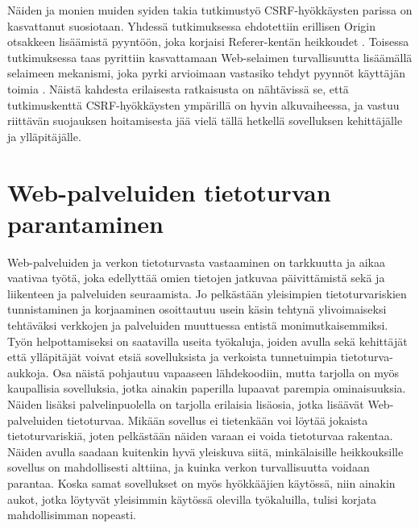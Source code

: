Näiden ja monien muiden syiden takia tutkimustyö CSRF-hyökkäysten parissa on kasvattanut suosiotaan. Yhdessä tutkimuksessa ehdotettiin erillisen Origin
otsakkeen lisäämistä pyyntöön, joka korjaisi Referer-kentän heikkoudet \cite{CSRF}. Toisessa tutkimuksessa taas pyrittiin kasvattamaan Web-selaimen turvallisuutta
lisäämällä selaimeen mekanismi, joka pyrki arvioimaan vastasiko tehdyt pyynnöt käyttäjän toimia \cite{CSRFb}. Näistä kahdesta erilaisesta ratkaisusta on nähtävissä se,
että tutkimuskenttä CSRF-hyökkäysten ympärillä on hyvin alkuvaiheessa, ja vastuu riittävän suojauksen hoitamisesta jää vielä tällä hetkellä 
sovelluksen kehittäjälle ja ylläpitäjälle.

\section{Web-palveluiden tietoturvan parantaminen}

Web-palveluiden ja verkon tietoturvasta vastaaminen on tarkkuutta ja aikaa vaativaa työtä, joka edellyttää omien tietojen jatkuvaa päivittämistä sekä ja liikenteen ja palveluiden
seuraamista. Jo pelkästään yleisimpien tietoturvariskien tunnistaminen ja korjaaminen osoittautuu usein käsin tehtynä ylivoimaiseksi tehtäväksi verkkojen ja palveluiden
muuttuessa entistä monimutkaisemmiksi. Työn helpottamiseksi on saatavilla useita työkaluja, joiden avulla sekä kehittäjät että ylläpitäjät voivat
etsiä sovelluksista ja verkoista tunnetuimpia tietoturva-aukkoja. Osa näistä pohjautuu vapaaseen lähdekoodiin, mutta tarjolla on myös kaupallisia sovelluksia, jotka ainakin 
paperilla lupaavat parempia ominaisuuksia. Näiden lisäksi palvelinpuolella on tarjolla erilaisia lisäosia, jotka lisäävät Web-palveluiden tietoturvaa. 
Mikään sovellus ei tietenkään voi löytää jokaista tietoturvariskiä, joten pelkästään näiden varaan ei voida tietoturvaa rakentaa. Näiden avulla 
saadaan kuitenkin hyvä yleiskuva siitä, minkälaisille heikkouksille sovellus on mahdollisesti alttiina, ja kuinka verkon turvallisuutta voidaan parantaa. Koska samat 
sovellukset on myös hyökkääjien käytössä, niin ainakin aukot, jotka löytyvät yleisimmin käytössä olevilla työkaluilla, tulisi korjata mahdollisimman nopeasti. 

